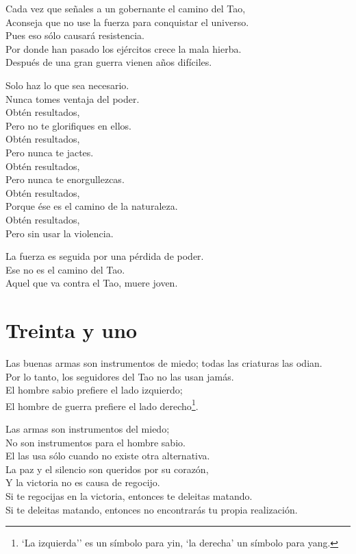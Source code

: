 \documentclass[hidelinks]{memoir}
\begin{document}
	Cada vez que señales a un gobernante el camino del Tao,\\
	Aconseja que no use la fuerza para conquistar el universo.\\
	Pues eso sólo causará resistencia.\\
	Por donde han pasado los ejércitos crece la mala hierba.\\
	Después de una gran guerra vienen años difíciles.
	
	Solo haz lo que sea necesario.\\
	Nunca tomes ventaja del poder.\\
	Obtén resultados,\\
	Pero no te glorifiques en ellos.\\
	Obtén resultados,\\
	Pero nunca te jactes.\\
	Obtén resultados,\\
	Pero nunca te enorgullezcas.\\
	Obtén resultados,\\
	Porque ése es el camino de la naturaleza.\\
	Obtén resultados,\\
	Pero sin usar la violencia.
	
	La fuerza es seguida por una pérdida de poder.\\
	Ese no es el camino del Tao.\\
	Aquel que va contra el Tao, muere joven.
	
	\chapter*{Treinta y uno}
	
	Las buenas armas son instrumentos de miedo; todas las criaturas las
	odian.\\
	Por lo tanto, los seguidores del Tao no las usan jamás.\\
	El hombre sabio prefiere el lado izquierdo;\\
	El hombre de guerra prefiere el lado derecho\footnote{`La izquierda'' es un símbolo para yin, `la derecha' un símbolo para
		yang.}.
	
	Las armas son instrumentos del miedo;\\
	No son instrumentos para el hombre sabio.\\
	El las usa sólo cuando no existe otra alternativa.\\
	La paz y el silencio son queridos por su corazón,\\
	Y la victoria no es causa de regocijo.\\
	Si te regocijas en la victoria, entonces te deleitas matando.\\
	Si te deleitas matando, entonces no encontrarás tu propia realización.
	
\end{document}
